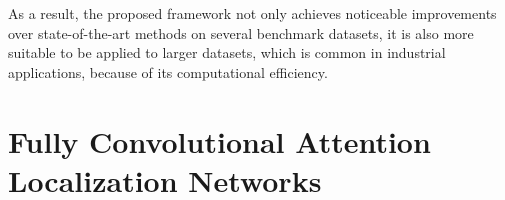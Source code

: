 \documentclass[runningheads]{llncs}
\begin{document}
As a result, the proposed framework not only achieves noticeable improvements over state-of-the-art methods on several benchmark datasets,
it is also more suitable to be applied to  larger datasets, which is common in industrial applications, because of its computational efficiency.





\section{Fully Convolutional Attention Localization Networks}
\end{document}
